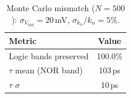 \begin{table}[ht]
\centering
\caption{Monte Carlo mismatch ($N=500$): $\sigma_{V_{th0}}=20$\,mV, $\sigma_{k_n}/k_n=5\%$.}
\label{tbl:mismatch}
\begin{tabular}{@{}lc@{}}
\toprule
Metric & Value \\
\midrule
Logic bands preserved & 100.0\% \\
$\tau$ mean (NOR band) & 103\,ps \\
$\tau$ $\sigma$ & 10\,ps \\
\bottomrule
\end{tabular}
\end{table}
